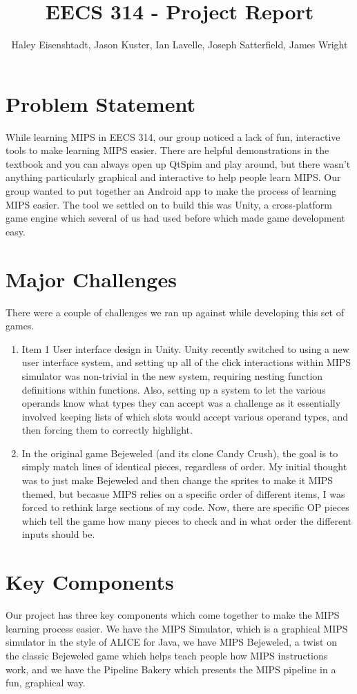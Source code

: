 \documentclass[12pt]{article}
\title{EECS 314 - Project Report}
\author{Haley Eisenshtadt, Jason Kuster, Ian Lavelle, Joseph Satterfield, James Wright}
\begin{document}
	\maketitle
	\section{Problem Statement}
	While learning MIPS in EECS 314, our group noticed a lack of fun, interactive tools to make learning MIPS easier. There are helpful demonstrations in the textbook and you can always open up QtSpim and play around, but there wasn't anything particularly graphical and interactive to help people learn MIPS. Our group wanted to put together an Android app to make the process of learning MIPS easier. The tool we settled on to build this was Unity, a cross-platform game engine which several of us had used before which made game development easy.
	\section{Major Challenges}
	There were a couple of challenges we ran up against while developing this set of games.
	\begin{enumerate}
		\item Item 1 User interface design in Unity. Unity recently switched to using a new user interface system, and setting up all of the click interactions within MIPS simulator was non-trivial in the new system, requiring nesting function definitions within functions. Also, setting up a system to let the various operands know what types they can accept was a challenge as it essentially involved keeping lists of which slots would accept various operand types, and then forcing them to correctly highlight.
		\item In the original game Bejeweled (and its clone Candy Crush), the goal is to simply match lines of identical pieces, regardless of order. My initial thought was to just make Bejeweled and then change the sprites to make it MIPS themed, but becasue MIPS relies on a specific order of different items, I was forced to rethink large sections of my code. Now, there are specific OP pieces which tell the game how many pieces to check and in what order the different inputs should be.
	\end{enumerate}
	\section{Key Components}
	Our project has three key components which come together to make the MIPS learning process easier. We have the MIPS Simulator, which is a graphical MIPS simulator in the style of ALICE for Java, we have MIPS Bejeweled, a twist on the classic Bejeweled game which helps teach people how MIPS instructions work, and we have the Pipeline Bakery which presents the MIPS pipeline in a fun, graphical way.
\end{document}
